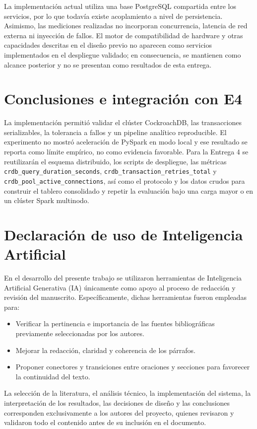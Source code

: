 \documentclass[12pt]{article}
\begin{document}
    La implementación actual utiliza una base PostgreSQL compartida entre los servicios, por lo que todavía existe acoplamiento a nivel de persistencia. Asimismo, las mediciones realizadas no incorporan concurrencia, latencia de red externa ni inyección de fallos. El motor de compatibilidad de hardware y otras capacidades descritas en el diseño previo no aparecen como servicios implementados en el despliegue validado; en consecuencia, se mantienen como alcance posterior y no se presentan como resultados de esta entrega.

\section{Conclusiones e integración con E4}

La implementación permitió validar el clúster CockroachDB, las transacciones
serializables, la tolerancia a fallos y un pipeline analítico reproducible. El
experimento no mostró aceleración de PySpark en modo local y ese resultado se
reporta como límite empírico, no como evidencia favorable. Para la Entrega 4 se
reutilizarán el esquema distribuido, los scripts de despliegue, las métricas
\texttt{crdb\_query\_duration\_seconds},
\texttt{crdb\_transaction\_retries\_total} y
\texttt{crdb\_pool\_active\_connections}, así como el protocolo y los datos
crudos para construir el tablero consolidado y repetir la evaluación bajo una
carga mayor o en un clúster Spark multinodo.

\section*{Declaración de uso de Inteligencia Artificial}

En el desarrollo del presente trabajo se utilizaron herramientas de Inteligencia Artificial Generativa (IA) únicamente como apoyo al proceso de redacción y revisión del manuscrito. Específicamente, dichas herramientas fueron empleadas para:

\begin{itemize}
    \item Verificar la pertinencia e importancia de las fuentes bibliográficas previamente seleccionadas por los autores.
    \item Mejorar la redacción, claridad y coherencia de los párrafos.
    \item Proponer conectores y transiciones entre oraciones y secciones para favorecer la continuidad del texto.
\end{itemize}

La selección de la literatura, el análisis técnico, la implementación del sistema, la interpretación de los resultados, las decisiones de diseño y las conclusiones corresponden exclusivamente a los autores del proyecto, quienes revisaron y validaron todo el contenido antes de su inclusión en el documento.



    \newpage
    \printbibliography[title={Referencias}]
\end{document}
